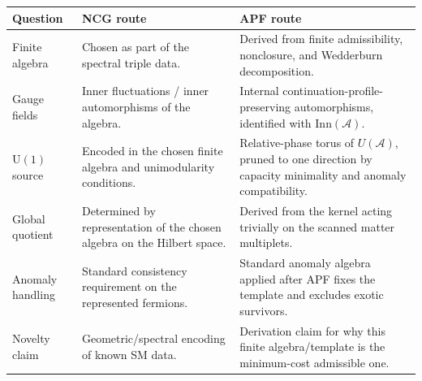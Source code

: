 \documentclass[11pt]{article}
\theoremstyle{definition}
\newcommand{\U}{\mathrm{U}}
\begin{document}
\smallskip
\begin{center}
\small
\renewcommand{\arraystretch}{1.12}
\begin{tabular}{@{}p{3.2cm}p{4.5cm}p{5.0cm}@{}}
\toprule
\textbf{Question} & \textbf{NCG route} & \textbf{APF route} \\
\midrule
Finite algebra & Chosen as part of the spectral triple data. & Derived from finite admissibility, nonclosure, and Wedderburn decomposition. \\
Gauge fields & Inner fluctuations / inner automorphisms of the algebra. & Internal continuation-profile-preserving automorphisms, identified with $\mathrm{Inn}(\mathcal A)$. \\
$\U(1)$ source & Encoded in the chosen finite algebra and unimodularity conditions. & Relative-phase torus of $U(\mathcal A)$, pruned to one direction by capacity minimality and anomaly compatibility. \\
Global quotient & Determined by representation of the chosen algebra on the Hilbert space. & Derived from the kernel acting trivially on the scanned matter multiplets. \\
Anomaly handling & Standard consistency requirement on the represented fermions. & Standard anomaly algebra applied after APF fixes the template and excludes exotic survivors. \\
Novelty claim & Geometric/spectral encoding of known SM data. & Derivation claim for why this finite algebra/template is the minimum-cost admissible one. \\
\bottomrule
\end{tabular}
\end{center}
\end{document}
